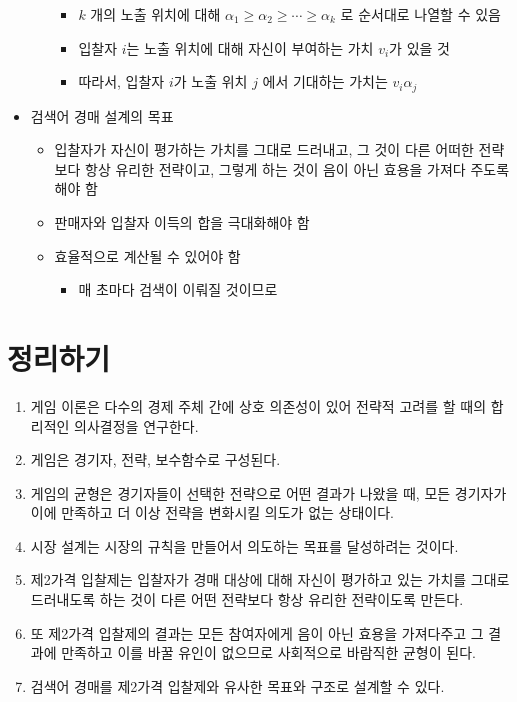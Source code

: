 \begin{itemize}
\begin{itemize}
\begin{itemize}
		\item $k$ 개의 노출 위치에 대해 $\alpha_{1} \geq \alpha_{2} \geq \cdots \geq \alpha_{k}$ 로 순서대로 나열할 수 있음
		\item 입찰자 $i$는 노출 위치에 대해 자신이 부여하는 가치 $v_{i}$가 있을 것
		\item 따라서, 입찰자 $i$가 노출 위치 $j$ 에서 기대하는 가치는 $v_{i}\alpha_{j}$ 
		\end{itemize}
	\end{itemize}
\item 검색어 경매 설계의 목표
	\begin{itemize}
	\item 입찰자가 자신이 평가하는 가치를 그대로 드러내고, 그 것이 다른 어떠한 전략보다 항상 유리한 전략이고, 그렇게 하는 것이 음이 아닌 효용을 가져다 주도록 해야 함
	\item 판매자와 입찰자 이득의 합을 극대화해야 함
	\item 효율적으로 계산될 수 있어야 함
		\begin{itemize}
		\item 매 초마다 검색이 이뤄질 것이므로
		\end{itemize}
	\end{itemize}
\end{itemize}

\pagebreak

\section*{정리하기}
\begin{enumerate}
\item 게임 이론은 다수의 경제 주체 간에 상호 의존성이 있어 전략적 고려를 할 때의 합리적인 의사결정을 연구한다.
\item 게임은 경기자, 전략, 보수함수로 구성된다.
\item 게임의 균형은 경기자들이 선택한 전략으로 어떤 결과가 나왔을 때, 모든 경기자가 이에 만족하고 더 이상 전략을 변화시킬 의도가 없는 상태이다. 
\item 시장 설계는 시장의 규칙을 만들어서 의도하는 목표를 달성하려는 것이다.
\item 제2가격 입찰제는 입찰자가 경매 대상에 대해 자신이 평가하고 있는 가치를 그대로 드러내도록 하는 것이 다른 어떤 전략보다 항상 유리한 전략이도록 만든다.
\item 또 제2가격 입찰제의 결과는 모든 참여자에게 음이 아닌 효용을 가져다주고 그 결과에 만족하고 이를 바꿀 유인이 없으므로 사회적으로 바람직한 균형이 된다.
\item 검색어 경매를 제2가격 입찰제와 유사한 목표와 구조로 설계할 수 있다.
\end{enumerate}